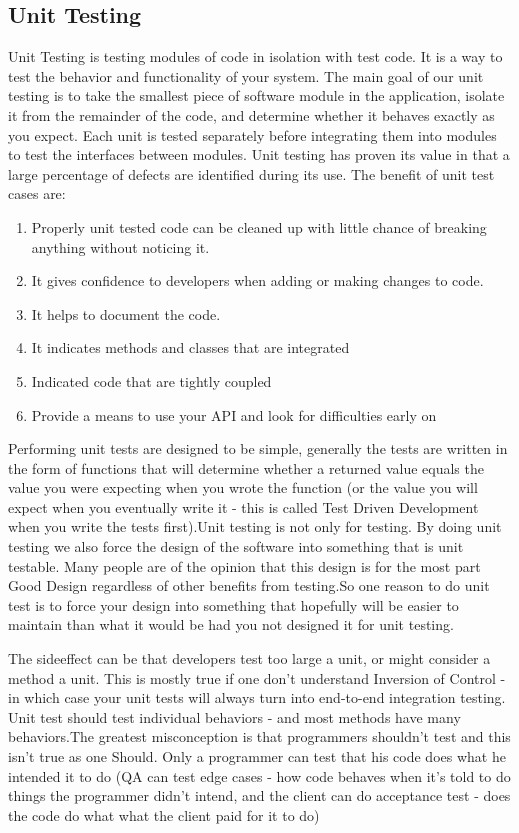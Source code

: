 \documentclass[article,type=msc,colorback,accentcolor=tud9c,twoside,11pt]{tudthesis}
\begin{document}
\subsection{Unit Testing}
Unit Testing\cite{EffectivnessofUnitTest} is testing modules of code in isolation with test code. It is a way to test the behavior and functionality of your system. The main goal of our unit testing is to take the smallest piece of software module in the application, isolate it from the remainder of the code, and determine whether it behaves exactly as you expect. Each unit is tested separately before integrating them into modules to test the interfaces between modules. Unit testing has proven its value in that a large percentage of defects are identified during its use. The benefit of unit test cases are:
\begin{enumerate}
	\item Properly unit tested code can be cleaned up with little chance of breaking anything without noticing it.
	\item It gives confidence to developers when adding or making changes to code.
	\item It helps to document the code.
	\item It indicates methods and classes that are integrated 
	\item Indicated code that are tightly coupled
	\item Provide a means to use your API and look for difficulties early on 
\end{enumerate}
Performing unit tests are designed to be simple, generally the tests are written in the form of functions that will determine whether a returned value equals the value you were expecting when you wrote the function (or the value you will expect when you eventually write it - this is called Test Driven Development when you write the tests first).Unit testing is not only for testing. By doing unit testing we also force the design of the software into something that is unit testable. Many people are of the opinion that this design is for the most part Good Design regardless of other benefits from testing.So one reason to do unit test is to force your design into something that hopefully will be easier to maintain than what it would be had you not designed it for unit testing.

The sideeffect can be that developers test too large a unit, or might consider a method a unit. This is mostly true if one don't understand Inversion of Control - in which case your unit tests will always turn into end-to-end integration testing. Unit test should test individual behaviors - and most methods have many behaviors.The greatest misconception is that programmers shouldn't test and this isn't true as one Should. Only a programmer can test that his code does what he intended it to do (QA can test edge cases - how code behaves when it's told to do things the programmer didn't intend, and the client can do acceptance test - does the code do what what the client paid for it to do)
\end{document}
